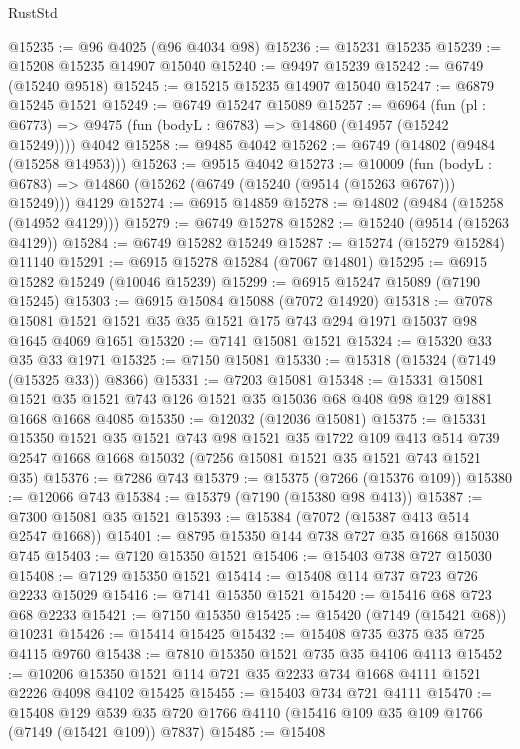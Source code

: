 \begin{lexlean}{RustStd}
\begin{coremodule}
@15235 := @96 @4025 (@96 @4034 @98)
@15236 := @15231 @15235
@15239 := @15208 @15235 @14907 @15040
@15240 := @9497 @15239
@15242 := @6749 (@15240 @9518)
@15245 := @15215 @15235 @14907 @15040
@15247 := @6879 @15245 @1521
@15249 := @6749 @15247 @15089
@15257 := @6964
    (fun (pl : @6773) => @9475 (fun (bodyL : @6783) => @14860 (@14957 (@15242 @15249))))
    @4042
@15258 := @9485 @4042
@15262 := @6749 (@14802 (@9484 (@15258 @14953)))
@15263 := @9515 @4042
@15273 := @10009
    (fun (bodyL : @6783) => @14860 (@15262 (@6749 (@15240 (@9514 (@15263 @6767))) @15249)))
    @4129
@15274 := @6915 @14859
@15278 := @14802 (@9484 (@15258 (@14952 @4129)))
@15279 := @6749 @15278
@15282 := @15240 (@9514 (@15263 @4129))
@15284 := @6749 @15282 @15249
@15287 := @15274 (@15279 @15284) @11140
@15291 := @6915 @15278 @15284 (@7067 @14801)
@15295 := @6915 @15282 @15249 (@10046 @15239)
@15299 := @6915 @15247 @15089 (@7190 @15245)
@15303 := @6915 @15084 @15088 (@7072 @14920)
@15318 := @7078 @15081 @1521 @1521 @35 @35 @1521 @175 @743 @294 @1971 @15037 @98 @1645 @4069 @1651
@15320 := @7141 @15081 @1521
@15324 := @15320 @33 @35 @33 @1971
@15325 := @7150 @15081
@15330 := @15318 (@15324 (@7149 (@15325 @33)) @8366)
@15331 := @7203 @15081
@15348 := @15331
    @15081
    @1521
    @35
    @1521
    @743
    @126
    @1521
    @35
    @15036
    @68
    @408
    @98
    @129
    @1881
    @1668
    @1668
    @4085
@15350 := @12032 (@12036 @15081)
@15375 := @15331
    @15350
    @1521
    @35
    @1521
    @743
    @98
    @1521
    @35
    @1722
    @109
    @413
    @514
    @739
    @2547
    @1668
    @1668
    @15032
    (@7256 @15081 @1521 @35 @1521 @743 @1521 @35)
@15376 := @7286 @743
@15379 := @15375 (@7266 (@15376 @109))
@15380 := @12066 @743
@15384 := @15379 (@7190 (@15380 @98 @413))
@15387 := @7300 @15081 @35 @1521
@15393 := @15384 (@7072 (@15387 @413 @514 @2547 @1668))
@15401 := @8795 @15350 @144 @738 @727 @35 @1668 @15030 @745
@15403 := @7120 @15350 @1521
@15406 := @15403 @738 @727 @15030
@15408 := @7129 @15350 @1521
@15414 := @15408 @114 @737 @723 @726 @2233 @15029
@15416 := @7141 @15350 @1521
@15420 := @15416 @68 @723 @68 @2233
@15421 := @7150 @15350
@15425 := @15420 (@7149 (@15421 @68)) @10231
@15426 := @15414 @15425
@15432 := @15408 @735 @375 @35 @725 @4115 @9760
@15438 := @7810 @15350 @1521 @735 @35 @4106 @4113
@15452 := @10206 @15350 @1521 @114 @721 @35 @2233 @734 @1668 @4111 @1521 @2226 @4098 @4102 @15425
@15455 := @15403 @734 @721 @4111
@15470 := @15408
    @129
    @539
    @35
    @720
    @1766
    @4110
    (@15416 @109 @35 @109 @1766 (@7149 (@15421 @109)) @7837)
@15485 := @15408

\end{coremodule}
\end{lexlean}
